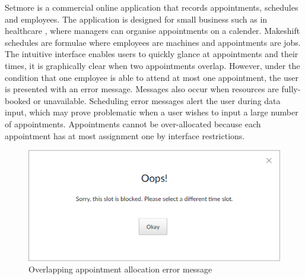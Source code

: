 Setmore is a commercial online application that records appointments, schedules and employees. The application is designed for small business such as in healthcare \cite{setmore}, where managers can organise appointments on a calender. Makeshift schedules are formulae where employees are machines and appointments are jobs. The intuitive interface enables users to quickly glance at appointments and their times, it is graphically clear when two appointments overlap. However, under the condition that one employee is able to attend at most one appointment, the user is presented with an error message. Messages also occur when resources are fully-booked or unavailable. Scheduling error messages alert the user during data input, which may prove problematic when a user wishes to input a large number of appointments. Appointments cannot be over-allocated because each appointment has at most assignment one by interface restrictions.

\begin{figure}[H]
	\begin{center}
		\includegraphics[scale=0.6]{figures/setmoreerror1.png}
	\end{center}
	\caption{Overlapping appointment allocation error message}
\end{figure}

